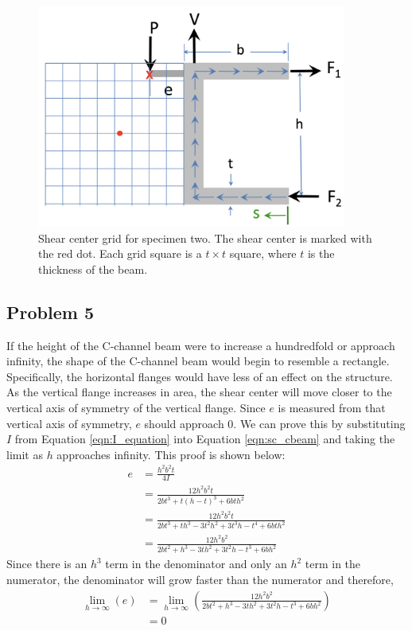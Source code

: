 \documentclass[12 pt]{report}
\begin{document}
\begin{figure}[htbp]
	\centering
	\includegraphics[width=4in]{images/shear_center_2}
	\caption{Shear center grid for specimen two. The shear center is marked with the red dot. Each grid square is a $t\times{}t$ square, where $t$ is the thickness of the beam.}
	\label{fig:sc_grid_2}
\end{figure}

\subsection{Problem 5}
If the height of the C-channel beam were to increase a hundredfold or approach infinity, the shape of the C-channel beam would begin to resemble a rectangle. Specifically, the horizontal flanges would have less of an effect on the structure. As the vertical flange increases in area, the shear center will move closer to the vertical axis of symmetry of the vertical flange. Since $e$ is measured from that vertical axis of symmetry, $e$ should approach \num{0}. We can prove this by substituting $I$ from Equation \ref{eqn:I_equation} into Equation \ref{eqn:sc_cbeam} and taking the limit as $h$ approaches infinity. This proof is shown below:
\begin{align*}
	e&=\frac{h^2b^2t}{4I}\\
	&=\frac{12h^2b^2t}{2bt^3+t(h-t)^3+6bth^2}\\
	&=\frac{12h^2b^2t}{2bt^3+th^3-3t^2h^2+3t^3h-t^4+6bth^2}\\
	&=\frac{12h^2b^2}{2bt^2+h^3-3th^2+3t^2h-t^3+6bh^2}
\end{align*}
Since there is an $h^3$ term in the denominator and only an $h^2$ term in the numerator, the denominator will grow faster than the numerator and therefore,
\begin{align*}
	\lim_{h\rightarrow\infty}(e)&=\lim_{h\rightarrow\infty}\left(\frac{12h^2b^2}{2bt^2+h^3-3th^2+3t^2h-t^3+6bh^2}\right)\\
	&=0
\end{align*}
\end{document}
